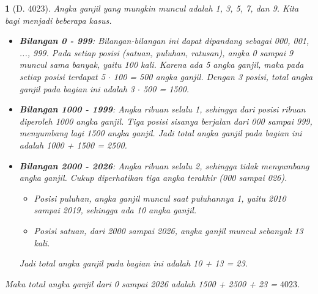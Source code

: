 \documentclass[11pt,a4paper,DIV=12]{scrartcl}
\theoremstyle{problemstyle}
\theoremstyle{answerstyle}
\newtheorem{answer}{}
\begin{document}
\begin{answer}[D. 4023]
  Angka ganjil yang mungkin muncul adalah 1, 3, 5, 7, dan 9. Kita bagi menjadi beberapa kasus.
  \begin{itemize}
    \item \textbf{Bilangan 0 - 999}:
          Bilangan-bilangan ini dapat dipandang sebagai 000, 001, ..., 999. Pada setiap posisi (satuan, puluhan, ratusan), angka 0 sampai 9 muncul sama banyak, yaitu 100 kali. Karena ada 5 angka ganjil, maka pada setiap posisi terdapat 5 $\cdot$ 100 = 500 angka ganjil. Dengan 3 posisi, total angka ganjil pada bagian ini adalah 3 $\cdot$ 500 = 1500.
    \item \textbf{Bilangan 1000 - 1999}:
          Angka ribuan selalu 1, sehingga dari posisi ribuan diperoleh 1000 angka ganjil. Tiga posisi sisanya berjalan dari 000 sampai 999, menyumbang lagi 1500 angka ganjil. Jadi total angka ganjil pada bagian ini adalah 1000 + 1500 = 2500.
    \item \textbf{Bilangan 2000 - 2026}:
          Angka ribuan selalu 2, sehingga tidak menyumbang angka ganjil. Cukup diperhatikan tiga angka terakhir (000 sampai 026).
          \begin{itemize}[label=$\blacksquare$]
            \item Posisi puluhan, angka ganjil muncul saat puluhannya 1, yaitu 2010 sampai 2019, sehingga ada 10 angka ganjil.
            \item Posisi satuan, dari 2000 sampai 2026, angka ganjil muncul sebanyak 13 kali.
          \end{itemize}
          Jadi total angka ganjil pada bagian ini adalah 10 + 13 = 23.
  \end{itemize}

  Maka total angka ganjil dari 0 sampai 2026 adalah 1500 + 2500 + 23 = $\boxed{4023}$.
\end{answer}
\end{document}

